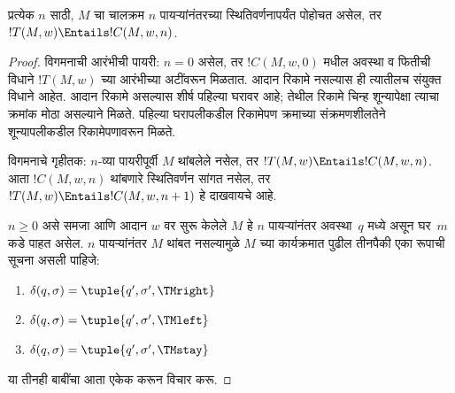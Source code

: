 \documentclass[../../../include/open-logic-section]{subfiles}
\begin{document}
\begin{lem}
प्रत्येक $n$ साठी,
$M$ चा चालक्रम $n$ पायऱ्यांनंतरच्या
स्थितिवर्णनापर्यंत पोहोचत असेल, तर
$!T(M, w)
\Entails !C(M, w, n)$.
\end{lem}
%

\begin{proof}
विगमनाची आरंभीची पायरी:
$n = 0$ असेल, तर
$!C(M, w, 0)$ मधील अवस्था व फितीची विधाने
$!T(M, w)$ च्या आरंभीच्या अटींवरून मिळतात.
आदान रिकामे नसल्यास ही त्यातीलच संयुक्त विधाने आहेत.
आदान रिकामे असल्यास शीर्ष पहिल्या घरावर आहे;
तेथील रिकामे चिन्ह शून्यापेक्षा त्याचा क्रमांक मोठा
असल्याने मिळते. पहिल्या घरापलीकडील रिकामेपण
क्रमाच्या संक्रमणशीलतेने शून्यापलीकडील
रिकामेपणावरून मिळते.

विगमनाचे गृहीतक:
$n$-व्या पायरीपूर्वी $M$
थांबलेले नसेल, तर
$!T(M,w) \Entails !C(M, w, n)$.
आता $!C(M, w, n)$
थांबणारे स्थितिवर्णन सांगत
नसेल, तर $!T(M, w) \Entails
!C(M, w, n+1)$ हे
दाखवायचे आहे.

$n \ge 0$ असे समजा
आणि आदान $w$ वर
सुरू केलेले $M$ हे
$n$ पायऱ्यांनंतर
अवस्था~$q$ मध्ये असून
घर~$m$ कडे पाहत
असेल. $n$ पायऱ्यांनंतर
$M$ थांबत नसल्यामुळे
$M$ च्या कार्यक्रमात
पुढील तीनपैकी एका
रूपाची सूचना असली पाहिजे:

\begin{enumerate} 
\item {} $\delta(q, \sigma) = \tuple{q', \sigma', \TMright}$

\item {} $\delta(q, \sigma) = \tuple{q', \sigma', \TMleft}$

\item {} $\delta(q, \sigma) = \tuple{q', \sigma', \TMstay}$
\end{enumerate}

या तीनही बाबींचा आता
एकेक करून विचार करू.


\end{proof}
\end{document}
